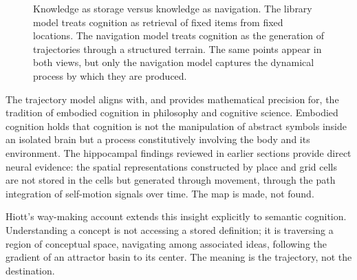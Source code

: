 \documentclass[11pt, a4paper]{article}
\theoremstyle{plain}
\theoremstyle{definition}
\theoremstyle{remark}
\begin{document}
\begin{figure}[h]
\centering
{}
\caption{Knowledge as storage versus knowledge as navigation. The library model treats
cognition as retrieval of fixed items from fixed locations. The navigation model treats
cognition as the generation of trajectories through a structured terrain. The same
points appear in both views, but only the navigation model captures the dynamical
process by which they are produced.}
\end{figure}

The trajectory model aligns with, and provides mathematical precision for, the tradition
of embodied cognition in philosophy and cognitive science. Embodied cognition holds that
cognition is not the manipulation of abstract symbols inside an isolated brain but a
process constitutively involving the body and its environment. The hippocampal findings
reviewed in earlier sections provide direct neural evidence: the spatial representations
constructed by place and grid cells are not stored in the cells but generated through
movement, through the path integration of self-motion signals over time. The map is made,
not found.

Hiott's way-making account extends this insight explicitly to semantic cognition.
Understanding a concept is not accessing a stored definition; it is traversing a region
of conceptual space, navigating among associated ideas, following the gradient of an
attractor basin to its center. The meaning is the trajectory, not the destination.
\end{document}
